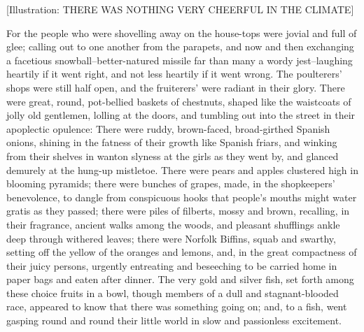 [Illustration: THERE WAS NOTHING VERY CHEERFUL IN THE CLIMATE]

For the people who were shovelling away on the house-tops were jovial
and full of glee; calling out to one another from the parapets, and now
and then exchanging a facetious snowball--better-natured missile far
than many a wordy jest--laughing heartily if it went right, and not less
heartily if it went wrong. The poulterers' shops were still half open,
and the fruiterers' were radiant in their glory. There were great,
round, pot-bellied baskets of chestnuts, shaped like the waistcoats of
jolly old gentlemen, lolling at the doors, and tumbling out into the
street in their apoplectic opulence: There were ruddy, brown-faced,
broad-girthed Spanish onions, shining in the fatness of their growth
like Spanish friars, and winking from their shelves in wanton slyness at
the girls as they went by, and glanced demurely at the hung-up
mistletoe. There were pears and apples clustered high in blooming
pyramids; there were bunches of grapes, made, in the shopkeepers'
benevolence, to dangle from conspicuous hooks that people's mouths might
water gratis as they passed; there were piles of filberts, mossy and
brown, recalling, in their fragrance, ancient walks among the woods, and
pleasant shufflings ankle deep through withered leaves; there were
Norfolk Biffins, squab and swarthy, setting off the yellow of the
oranges and lemons, and, in the great compactness of their juicy
persons, urgently entreating and beseeching to be carried home in paper
bags and eaten after dinner. The very gold and silver fish, set forth
among these choice fruits in a bowl, though members of a dull and
stagnant-blooded race, appeared to know that there was something going
on; and, to a fish, went gasping round and round their little world in
slow and passionless excitement.


